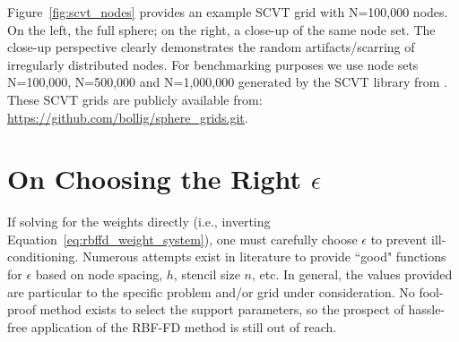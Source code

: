 \documentclass[11pt]{report}
\begin{document}
{Figure~\ref{fig:scvt_nodes} provides an example SCVT grid with N=100,000 nodes. On the left, the full sphere; on the right, a close-up of the same node set. The close-up perspective clearly demonstrates the random artifacts/scarring of irregularly distributed nodes. For benchmarking purposes we use node sets N=100,000, N=500,000 and N=1,000,000 generated by the SCVT library from \cite{Womeldorff2008}. These SCVT grids are publicly available from: \url{https://github.com/bollig/sphere_grids.git}.




%
%
%
%


\section{On Choosing the Right $\epsilon$} 



If solving for the weights directly (i.e., inverting Equation~\ref{eq:rbffd_weight_system}), one must carefully choose $\epsilon$ to prevent ill-conditioning. Numerous attempts exist in literature to provide ``good" functions for $\epsilon$ based on node spacing, $h$, stencil size $n$, etc. In general, the values provided are particular to the specific problem and/or grid under consideration. No fool-proof method exists to select the support parameters, so the prospect of hassle-free application of the RBF-FD method is still out of reach. 

}
\end{document}

